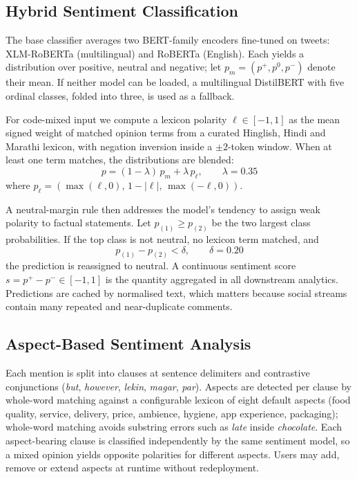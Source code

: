 \documentclass[conference]{IEEEtran}
\begin{document}
\subsection{Hybrid Sentiment Classification}

The base classifier averages two BERT-family encoders fine-tuned on tweets:
XLM-RoBERTa (multilingual) and RoBERTa (English). Each yields a distribution over
positive, neutral and negative; let $p_m = (p^+, p^0, p^-)$ denote their mean. If neither
model can be loaded, a multilingual DistilBERT with five ordinal classes, folded into
three, is used as a fallback.

For code-mixed input we compute a lexicon polarity $\ell \in [-1,1]$ as the mean signed
weight of matched opinion terms from a curated Hinglish, Hindi and Marathi lexicon, with
negation inversion inside a $\pm 2$-token window. When at least one term matches, the
distributions are blended:
\begin{equation}
p = (1-\lambda)\,p_m + \lambda\,p_\ell, \qquad \lambda = 0.35
\end{equation}
where $p_\ell = (\max(\ell,0),\, 1-|\ell|,\, \max(-\ell,0))$.

A neutral-margin rule then addresses the model's tendency to assign weak polarity to
factual statements. Let $p_{(1)} \ge p_{(2)}$ be the two largest class probabilities. If
the top class is not neutral, no lexicon term matched, and
\begin{equation}
p_{(1)} - p_{(2)} < \delta, \qquad \delta = 0.20
\end{equation}
the prediction is reassigned to neutral. A continuous sentiment score
$s = p^+ - p^- \in [-1,1]$ is the quantity aggregated in all downstream analytics.
Predictions are cached by normalised text, which matters because social streams contain
many repeated and near-duplicate comments.

\subsection{Aspect-Based Sentiment Analysis}

Each mention is split into clauses at sentence delimiters and contrastive conjunctions
(\emph{but}, \emph{however}, \emph{lekin}, \emph{magar}, \emph{par}). Aspects are detected
per clause by whole-word matching against a configurable lexicon of eight default aspects
(food quality, service, delivery, price, ambience, hygiene, app experience, packaging);
whole-word matching avoids substring errors such as \emph{late} inside \emph{chocolate}.
Each aspect-bearing clause is classified independently by the same sentiment model, so a
mixed opinion yields opposite polarities for different aspects. Users may add, remove or
extend aspects at runtime without redeployment.
\end{document}
